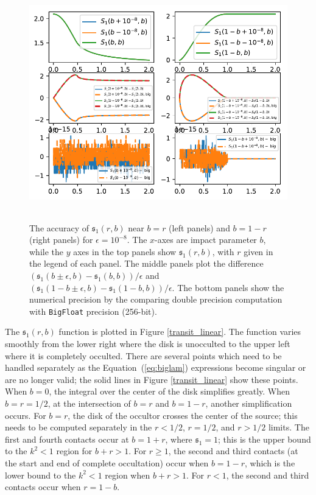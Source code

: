 \documentclass[modern,trackchanges]{aastex63}
\begin{document}
\begin{figure}[p!]
    \begin{centering}
    \includegraphics[height=4in]{figures/julia/s2_machine.pdf}
    \caption{The accuracy of $\mathfrak{s}_1(r,b)$ near $b=r$ (left panels) and
    $b=1-r$ (right panels) for $\epsilon = 10^{-8}$. The $x$-axes are impact parameter $b$,
    while the $y$ axes in the top panels show $\mathfrak{s}_1(r,b)$, with $r$
    given in the legend of each panel. The middle panels plot
    the difference $(\mathfrak{s}_1(b\pm\epsilon,b)-\mathfrak{s}_1(b,b))/\epsilon$
    and $(\mathfrak{s}_1(1-b\pm\epsilon,b)-\mathfrak{s}_1(1-b,b))/\epsilon$. The bottom
    panels show the numerical precision by the comparing double precision
    computation with \texttt{BigFloat} precision (256-bit). \label{s2_machine}}
    \end{centering}
\end{figure}

The $\mathfrak{s}_1(r,b)$ function is plotted in Figure \ref{transit_linear}. The
function varies smoothly from the lower right where the disk is
unocculted to the upper left where it is completely occulted.
There are several points which need to be handled separately as
the Equation~(\ref{eq:biglam}) expressions become singular or are
no longer valid;  the solid lines in Figure \ref{transit_linear} show
these points.  When $b=0$, the integral over the center of the
disk simplifies greatly.  When $b=r=1/2$, at the intersection of
$b=r$ and $b=1-r$, another simplification occurs.  For $b=r$,
the disk of the occultor crosses the center of the source;
this needs to be computed separately in the $r<1/2$, $r=1/2$,
and $r>1/2$ limits.  The first and fourth contacts occur at
$b=1+r$, where $\mathfrak{s}_1=1$;  this is the upper bound to the $k^2 < 1$
region for $b+r >1$.
For $r \ge 1$, the second and third contacts (at the start and
end of complete occultation) occur when $b=1-r$, which is the
lower  bound to the $k^2<1$ region when $b+r >1$.
For $r < 1$, the second and third contacts occur when $r=1-b$.
\end{document}
